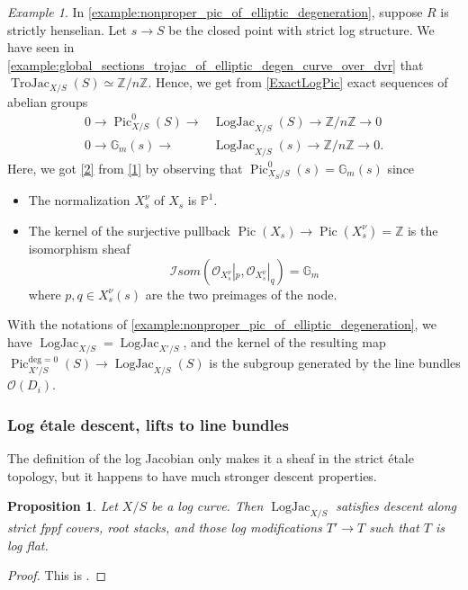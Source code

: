 \documentclass[a4paper,11pt]{amsart} %
\numberwithin{equation}{subsection}
\newcommand{\on}[1]{\operatorname{#1}}
\newcommand{\bb}[1]{{\mathbb{#1}}}
\newcommand{\ca}[1]{{\mathcal{#1}}}
\def\Logjac{\operatorname{LogJac}}
\theoremstyle{definition}
\theoremstyle{plain}%
\newtheorem{proposition}[definition]{Proposition}
\theoremstyle{remark}
\newtheorem{example}[definition]{Example}
\begin{document}
\begin{example}
    In \ref{example:nonproper_pic_of_elliptic_degeneration}, suppose $R$ is strictly henselian. Let $s \to S$ be the closed point with strict log structure. We have seen in \ref{example:global_sections_trojac_of_elliptic_degen_curve_over_dvr} that $\on{TroJac}_{X/S}(S) \simeq \bb Z/n\bb Z$. Hence, we get from \ref{ExactLogPic} exact sequences of abelian groups
    \begin{align}
        0 \to \on{Pic}^0_{X/S}(S) \to & \Logjac_{X/S}(S) \to \bb Z/n\bb Z\to 0\label{1} \\
        0 \to \bb G_m(s) \to & \on{LogJac}_{X/S}(s) \to \bb Z/n\bb Z \to 0.\label{2}
    \end{align}
    Here, we got \ref{2} from \ref{1} by observing that $\on{Pic}^0_{X_S/S}(s)=\bb G_m(s)$ since
    \begin{itemize}
        \item The normalization $X_s^\nu$ of $X_s$ is $\bb P^1$.
        \item The kernel of the surjective pullback $\on{Pic}(X_s) \to \on{Pic}(X^\nu_s) = \bb Z$ is the isomorphism sheaf
        \[
        \ca Isom(\ca O_{X^\nu_s}|_p,\ca O_{X^\nu_s}|_q) = \bb G_m
        \]
        where $p,q\in X^\nu_s(s)$ are the two preimages of the node.
    \end{itemize}
    With the notations of \ref{example:nonproper_pic_of_elliptic_degeneration}, we have $\on{LogJac}_{X/S}=\on{LogJac}_{X'/S}$, and the kernel of the resulting map $\on{Pic}^{\mathrm{deg}=0}_{X'/S}(S) \to \on{LogJac}_{X/S}(S)$ is the subgroup generated by the line bundles $\ca O(D_i)$.
\end{example}
\subsubsection{Log \'etale descent, lifts to line bundles}\label{section:log_etale_descent}

The definition of the log Jacobian only makes it a sheaf in the strict \'etale topology, but it happens to have much stronger descent properties.

\begin{proposition}\label{proposition:descent_for_logjac}
    Let $X/S$ be a log curve. Then $\Logjac_{X/S}$ satisfies descent along strict fppf covers, root stacks, and those log modifications $T' \to T$ such that $T$ is log flat.
\end{proposition}

\begin{proof}
    This is \cite[Corollary 4.4.14.2]{molcho_wise_2022}.
\end{proof}
\end{document}
